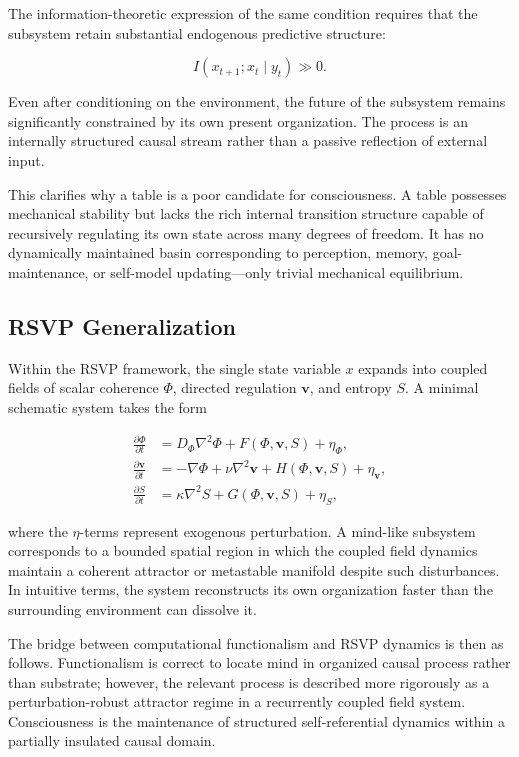 \documentclass[12pt,a4paper]{article}
\theoremstyle{plain}
\theoremstyle{definition}
\begin{document}
The information-theoretic expression of the same condition requires that the subsystem retain substantial endogenous predictive structure:

\begin{equation}
I(x_{t+1}; x_t \mid y_t) \gg 0.
\end{equation}

Even after conditioning on the environment, the future of the subsystem remains significantly constrained by its own present organization. The process is an internally structured causal stream rather than a passive reflection of external input.

This clarifies why a table is a poor candidate for consciousness. A table possesses mechanical stability but lacks the rich internal transition structure capable of recursively regulating its own state across many degrees of freedom. It has no dynamically maintained basin corresponding to perception, memory, goal-maintenance, or self-model updating—only trivial mechanical equilibrium.

\subsection{RSVP Generalization}

Within the RSVP framework, the single state variable $x$ expands into coupled fields of scalar coherence $\Phi$, directed regulation $\mathbf{v}$, and entropy $S$. A minimal schematic system takes the form

\begin{align}
\frac{\partial \Phi}{\partial t}
&= D_\Phi \nabla^2 \Phi + F(\Phi,\mathbf{v},S) + \eta_\Phi, \\
\frac{\partial \mathbf{v}}{\partial t}
&= -\nabla\Phi + \nu\nabla^2\mathbf{v} + H(\Phi,\mathbf{v},S) + \eta_{\mathbf{v}}, \\
\frac{\partial S}{\partial t}
&= \kappa\nabla^2 S + G(\Phi,\mathbf{v},S) + \eta_S,
\end{align}

where the $\eta$-terms represent exogenous perturbation. A mind-like subsystem corresponds to a bounded spatial region in which the coupled field dynamics maintain a coherent attractor or metastable manifold despite such disturbances. In intuitive terms, the system reconstructs its own organization faster than the surrounding environment can dissolve it.

The bridge between computational functionalism and RSVP dynamics is then as follows. Functionalism is correct to locate mind in organized causal process rather than substrate; however, the relevant process is described more rigorously as a perturbation-robust attractor regime in a recurrently coupled field system. Consciousness is the maintenance of structured self-referential dynamics within a partially insulated causal domain.
\end{document}
